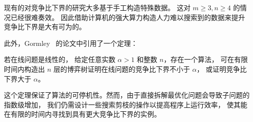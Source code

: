现有的对竞争比下界的研究大多基于手工构造特殊数据。
这对 $m\geq 3, n\geq 4$ 的情况已经很难奏效。
因此借助计算机的强大算力构造人力难以搜索到的数据来提升竞争比下界是大有可为的。

此外，Gormley~\cite{gormley2000generating} 的论文中引用了一个定理：
\begin{thm}
    若在线问题是线性的，
    给定任意实数 $\alpha>1$ 和整数 $n$，存在一个算法，
    可在有限时间内构造出 $n$ 层的博弈树证明在线问题的竞争比下界不小于 $\alpha$，
    或证明竞争比下界大于 $\alpha$。
\end{thm}
这个定理保证了算法的可停机性。然而，由于直接拆解最优化问题会导致子问题的指数级增加，
我们仍需设计一些搜索剪枝的操作以提高程序上运行效率，
使其能在有限的时间内寻找到具有更大竞争比下界的实例。